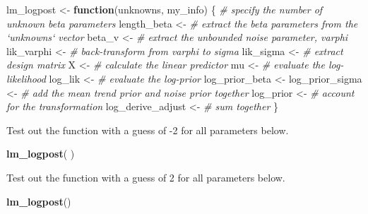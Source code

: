 \documentclass[
]{article}
\newenvironment{Shaded}{\begin{snugshade}}{\end{snugshade}}
\newcommand{\CommentTok}[1]{\textcolor[rgb]{0.56,0.35,0.01}{\textit{#1}}}
\newcommand{\ControlFlowTok}[1]{\textcolor[rgb]{0.13,0.29,0.53}{\textbf{#1}}}
\newcommand{\KeywordTok}[1]{\textcolor[rgb]{0.13,0.29,0.53}{\textbf{#1}}}
\newcommand{\NormalTok}[1]{#1}
\newcommand{\StringTok}[1]{\textcolor[rgb]{0.31,0.60,0.02}{#1}}
\begin{document}
\begin{Shaded}
\begin{Highlighting}[]
\NormalTok{lm_logpost <-}\StringTok{ }\ControlFlowTok{function}\NormalTok{(unknowns, my_info)}
\NormalTok{\{}
  \CommentTok{# specify the number of unknown beta parameters}
\NormalTok{  length_beta <-}\StringTok{ }
\StringTok{  }
\StringTok{  }\CommentTok{# extract the beta parameters from the `unknowns` vector}
\StringTok{  }\NormalTok{beta_v <-}\StringTok{ }
\StringTok{  }
\StringTok{  }\CommentTok{# extract the unbounded noise parameter, varphi}
\StringTok{  }\NormalTok{lik_varphi <-}\StringTok{ }
\StringTok{  }
\StringTok{  }\CommentTok{# back-transform from varphi to sigma}
\StringTok{  }\NormalTok{lik_sigma <-}\StringTok{ }
\StringTok{  }
\StringTok{  }\CommentTok{# extract design matrix}
\StringTok{  }\NormalTok{X <-}\StringTok{ }
\StringTok{  }
\StringTok{  }\CommentTok{# calculate the linear predictor}
\StringTok{  }\NormalTok{mu <-}\StringTok{ }
\StringTok{  }
\StringTok{  }\CommentTok{# evaluate the log-likelihood}
\StringTok{  }\NormalTok{log_lik <-}\StringTok{ }
\StringTok{  }
\StringTok{  }\CommentTok{# evaluate the log-prior}
\StringTok{  }\NormalTok{log_prior_beta <-}\StringTok{ }
\StringTok{  }
\StringTok{  }\NormalTok{log_prior_sigma <-}\StringTok{ }
\StringTok{  }
\StringTok{  }\CommentTok{# add the mean trend prior and noise prior together}
\StringTok{  }\NormalTok{log_prior <-}\StringTok{ }
\StringTok{  }
\StringTok{  }\CommentTok{# account for the transformation}
\StringTok{  }\NormalTok{log_derive_adjust <-}\StringTok{ }
\StringTok{  }
\StringTok{  }\CommentTok{# sum together}
\StringTok{  }
\NormalTok{\}}
\end{Highlighting}
\end{Shaded}

Test out the function with a guess of -2 for all parameters below.

\begin{Shaded}
\begin{Highlighting}[]
\KeywordTok{lm_logpost}\NormalTok{( )}
\end{Highlighting}
\end{Shaded}

Test out the function with a guess of 2 for all parameters below.

\begin{Shaded}
\begin{Highlighting}[]
\KeywordTok{lm_logpost}\NormalTok{()}
\end{Highlighting}
\end{Shaded}
\end{document}

